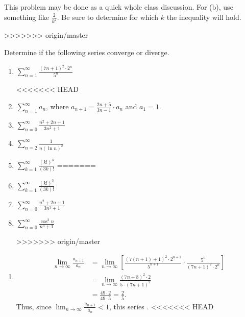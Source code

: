 \documentclass[handout]{ximera}
\begin{document}
\begin{instructorNotes}
This problem may be done as a quick whole class discussion.  
For (b), use something like $\frac{2}{k^2}$.  
Be sure to determine for which $k$ the inequality will hold.
\end{instructorNotes}


>>>>>>> origin/master





\begin{problem}
Determine if the following series converge or diverge.
	\begin{enumerate}
	
	\item  $\sum_{n=1}^\infty \frac{(7n+1)^2 \cdot 2^n}{5^n}$
	
<<<<<<< HEAD
	\item  $\sum_{n=1}^\infty a_n$, where $a_{n+1} = \frac{2n+5}{3n-1} \cdot a_n$ and $a_1 = 1$.
	
	\item  $\sum_{n=0}^\infty \frac{n^2 + 2n + 1}{3n^2 +1}$
	
	\item  $\sum_{n=2}^\infty \frac{1}{n(\ln n)^2}$
	
	\item $\sum_{k=1}^{\infty} \frac{(k!)^3}{(3k)!}$
=======
	
	\item $\sum_{k=1}^{\infty} \frac{(k!)^3}{(3k)!}$
	
	\item  $\sum_{n=0}^\infty \frac{n^2 + 2n + 1}{3n^3+1}$
	
	\item  $\sum_{n=0}^\infty \frac{\cos^2 n}{n^3+1}$
	
>>>>>>> origin/master
	
	\end{enumerate}
	
	\begin{freeResponse}
		\begin{enumerate}
	
		\item  {}
			\begin{align*}
			\lim_{n \to \infty} \frac{a_{n+1}}{a_n} 
			&= \lim_{n \to \infty} \left[ \frac{(7(n+1) + 1)^2 \cdot 2^{n+1}}{5^{n+1}} \cdot \frac{5^n}{(7n+1)^2 \cdot 2^n} \right]  \\
			&= \lim_{n \to \infty} \frac{(7n+8)^2 \cdot 2}{5 \cdot (7n+1)^2}  \\
			&= \frac{49 \cdot 2}{49 \cdot 5} = \frac{2}{5}.
			\end{align*}
		Thus, since $\lim_{n \to \infty} \frac{a_{n+1}}{a_n} < 1$, this series .  
<<<<<<< HEAD
		

\end{enumerate}
\end{freeResponse}
\end{problem}
\end{document}

